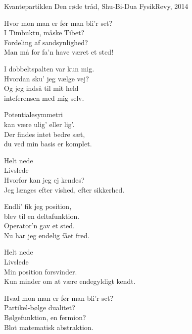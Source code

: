 \begin{song}{Kvantepartiklen}
  {} %
  {Den røde tråd, Shu-Bi-Dua} %
  {} %
  {FysikRevy, 2014} %
  {\NotCCLIed} %

  \begin{SBVerse}
    Hvor mon man er før man bli'r set?\\
    I Timbuktu, måske Tibet?\\
    Fordeling af sandsynlighed?\\
    Man må for fa'n have været et sted!
  \end{SBVerse}

  \begin{SBVerse}
    I dobbeltspalten var kun mig.\\
    Hvordan sku' jeg vælge vej?\\
    Og jeg indså til mit held\\
    inteferensen med mig selv.
  \end{SBVerse}

  \begin{SBVerse}
    Potentialesymmetri\\
    kan være ulig' eller lig'.\\
    Der findes intet bedre sæt,\\
    du ved min basis er komplet.
  \end{SBVerse}

  \begin{SBChorus}
    Helt nede\\
    Livslede\\
    Hvorfor kan jeg ej kendes?\\
    Jeg længes efter vished, efter sikkerhed.
  \end{SBChorus}

  \begin{SBVerse}
    Endli' fik jeg position,\\
    blev til en deltafunktion.\\
    Operator'n gav et sted.\\
    Nu har jeg endelig fået fred.
  \end{SBVerse}

  \begin{SBChorus}
    Helt nede\\
    Livslede\\
    Min position forsvinder.\\
    Kun minder om at være endegyldigt kendt.
  \end{SBChorus}

  \begin{SBVerse}
    Hvad mon man er før man bli'r set?\\
    Partikel-bølge dualitet?\\
    Bølgefunktion, en fermion?\\
    Blot matematisk abstraktion.
  \end{SBVerse}
\end{song}